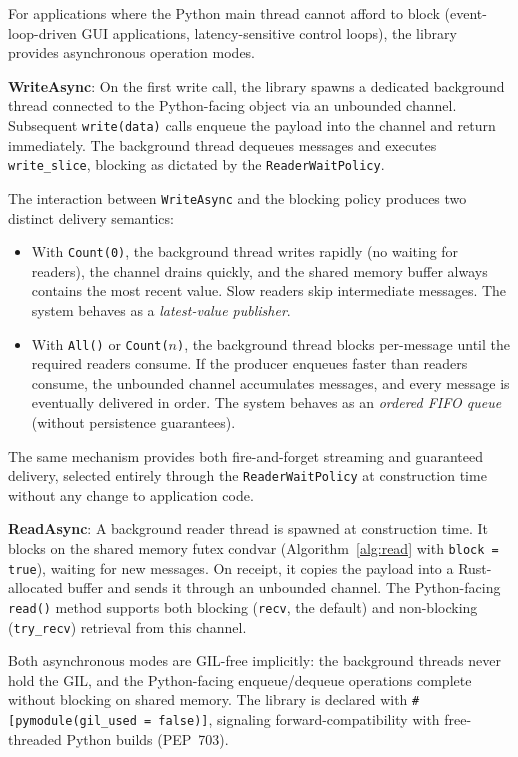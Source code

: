 For applications where the Python main thread cannot afford to block (event-loop-driven GUI applications, latency-sensitive control loops), the library provides asynchronous operation modes.

\textbf{WriteAsync}: On the first write call, the library spawns a dedicated background thread connected to the Python-facing object via an unbounded channel. Subsequent \texttt{write(data)} calls enqueue the payload into the channel and return immediately. The background thread dequeues messages and executes \texttt{write\_slice}, blocking as dictated by the \texttt{ReaderWaitPolicy}.

The interaction between \texttt{WriteAsync} and the blocking policy produces two distinct delivery semantics:

\begin{itemize}
    \item With \texttt{Count(0)}, the background thread writes rapidly (no waiting for readers), the channel drains quickly, and the shared memory buffer always contains the most recent value. Slow readers skip intermediate messages. The system behaves as a \emph{latest-value publisher}.

    \item With \texttt{All()} or \texttt{Count($n$)}, the background thread blocks per-message until the required readers consume. If the producer enqueues faster than readers consume, the unbounded channel accumulates messages, and every message is eventually delivered in order. The system behaves as an \emph{ordered FIFO queue} (without persistence guarantees).
\end{itemize}

The same mechanism provides both fire-and-forget streaming and guaranteed delivery, selected entirely through the \texttt{ReaderWaitPolicy} at construction time without any change to application code.

\textbf{ReadAsync}: A background reader thread is spawned at construction time. It blocks on the shared memory futex condvar (Algorithm~\ref{alg:read} with \texttt{block = true}), waiting for new messages. On receipt, it copies the payload into a Rust-allocated buffer and sends it through an unbounded channel. The Python-facing \texttt{read()} method supports both blocking (\texttt{recv}, the default) and non-blocking (\texttt{try\_recv}) retrieval from this channel.

Both asynchronous modes are GIL-free implicitly: the background threads never hold the GIL, and the Python-facing enqueue/dequeue operations complete without blocking on shared memory. The library is declared with \texttt{\#[pymodule(gil\_used = false)]}, signaling forward-compatibility with free-threaded Python builds (PEP~703).


